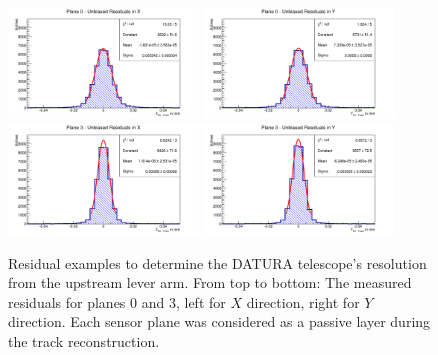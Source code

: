 \begin{figure}[tb]
\centering
\includegraphics[width=0.45\textwidth]{figures/resis_upstream/0x.pdf}
\includegraphics[width=0.45\textwidth]{figures/resis_upstream/0y.pdf}
\includegraphics[width=0.45\textwidth]{figures/resis_downstream/3x.pdf}
\includegraphics[width=0.45\textwidth]{figures/resis_downstream/3y.pdf}
\caption[Residual examples to determine the DATURA telescope's
resolution. Upstream lever arm]{Residual examples to determine the DATURA
telescope's resolution from the upstream lever arm. From top to bottom: The
measured residuals for planes $0$ and $3$, left for $X$
direction, right for $Y$ direction. Each sensor plane was considered as a
passive layer during the track reconstruction.}
\label{fig:residualexample1}
\end{figure}

